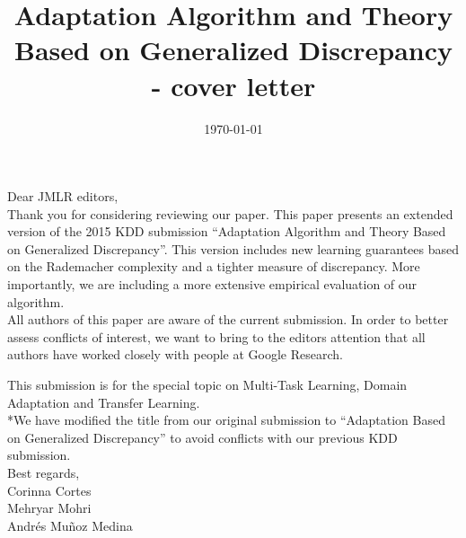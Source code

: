 \documentclass{article}
\title{Adaptation Algorithm and Theory Based on Generalized Discrepancy - cover letter}
\date{\today}
\begin{document}
\maketitle

\noindent Dear JMLR editors,
\\

Thank you for considering reviewing our paper. This paper presents an
extended version of the 2015 KDD submission ``Adaptation Algorithm and
Theory Based on Generalized Discrepancy''. This version includes new
learning guarantees based on the Rademacher complexity and a tighter
measure of discrepancy. More importantly, we are including a more
extensive empirical evaluation of our algorithm.
\\

All authors of this paper are aware of the current submission. In
order to better assess conflicts of interest, we want to bring to the
editors attention that all authors have worked closely with people at
Google Research.

This submission is for the special topic on Multi-Task Learning, Domain Adaptation and Transfer Learning.
\\

*We have modified the title from our original submission to
``Adaptation Based on Generalized Discrepancy'' to avoid conflicts
with our previous KDD submission. 
\\

\noindent Best regards, \\
Corinna Cortes \\
Mehryar Mohri \\
Andr\'es Mu\~noz Medina
\end{document}
